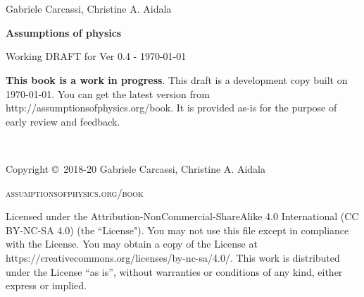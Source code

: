 \documentclass[11pt,letterpaper,fleqn]{memoir} %
\begin{document}
	





\frontmatter
\thispagestyle{empty} %

\newpage
\thispagestyle{empty}
~
\newpage

~
\thispagestyle{empty}

\vspace{20pt}

{\large \noindent Gabriele Carcassi, Christine A. Aidala }

\vspace{60pt}

{\Huge \noindent \textbf{Assumptions of physics}}

\vspace{30pt}

{\large \noindent Working DRAFT for Ver 0.4  - \today}

\vfill


\noindent \textbf{This book is a work in progress}. This draft is a development copy built on \today. You can get the latest version from http://assumptionsofphysics.org/book. It is provided as-is for the purpose of early review and feedback. 

\newpage
~\vfill
\thispagestyle{empty}

\noindent Copyright \copyright\ 2018-20 Gabriele Carcassi, Christine A. Aidala

\vspace{12pt}

\noindent \textsc{assumptionsofphysics.org/book}

\vspace{12pt}

\noindent Licensed under the Attribution-NonCommercial-ShareAlike 4.0 International (CC BY-NC-SA 4.0) (the ``License"). You may not use this file except in compliance with the License. You may obtain a copy of the License at https://creativecommons.org/licenses/by-nc-sa/4.0/. This work is distributed under the License ``as is'', without warranties or conditions of any kind, either express or implied.
\end{document}
